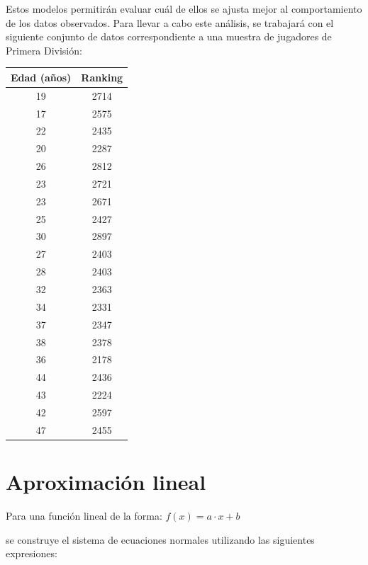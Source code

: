 \documentclass[12pt]{article}
\begin{document}
    Estos modelos permitirán evaluar cuál de ellos se ajusta mejor al comportamiento de los datos observados. Para llevar a cabo este análisis, se trabajará con el siguiente conjunto de datos correspondiente a una muestra de jugadores de Primera División:

    \vspace{1.5cm}

    \begin{center}
        \begin{tabular}{|c|c|}
            \hline
                \textbf{Edad (años)} & \textbf{Ranking} \\
            \hline
            19 & 2714 \\
            17 & 2575 \\
            22 & 2435 \\
            20 & 2287 \\
            26 & 2812 \\
            23 & 2721 \\
            23 & 2671 \\
            25 & 2427 \\
            30 & 2897 \\
            27 & 2403 \\
            28 & 2403 \\
            32 & 2363 \\
            34 & 2331 \\
            37 & 2347 \\
            38 & 2378 \\
            36 & 2178 \\
            44 & 2436 \\
            43 & 2224 \\
            42 & 2597 \\
            47 & 2455 \\
            \hline
        \end{tabular}
    \end{center}

\newpage
    \section*{Aproximación lineal}

        
        Para una función lineal de la forma: $f(x) = a \cdot x + b$


        se construye el sistema de ecuaciones normales utilizando las siguientes expresiones:
\end{document}
